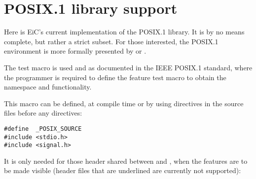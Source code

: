 \section{POSIX.1 library support}
\label{sec:Posix.1Library}


Here is EiC's current implementation of the POSIX.1 library. It is by
no means complete, but rather a strict subset. For those interested,
the POSIX.1 environment is more formally presented by
\cite{zlotnick91} or \cite{stevens92}.

The test macro  is used and as documented in the IEEE
POSIX.1 standard, where the programmer is required to define the
 feature test macro to obtain the  namespace and
 functionality. 

This macro can be defined, at compile time  or
by using  directives in the source files before any
 directives:

\begin{production}
\begin{verbatim}
#define  _POSIX_SOURCE
#include <stdio.h>
#include <signal.h>
\end{verbatim}
\end{production}

It is only needed for those header shared between  and
, when the  features are to be made visible 
(header files that are underlined are currently not supported):

